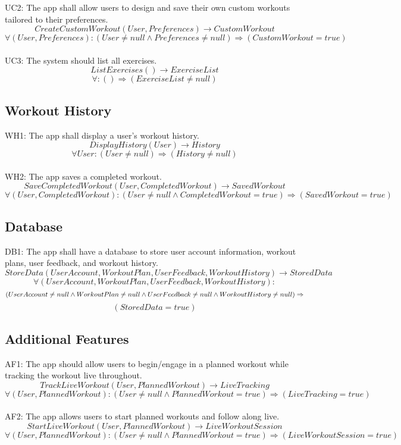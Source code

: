 \documentclass[12pt]{article}
\begin{document}
UC2: The app shall allow users to design and save their own custom workouts tailored to their preferences.
\[CreateCustomWorkout(User, Preferences) \rightarrow CustomWorkout \]
\[ \forall (User, Preferences):(User \neq null \land Preferences \neq null) \Rightarrow (CustomWorkout = true) \]\\

UC3: The system should list all exercises.
\[ListExercises() \rightarrow ExerciseList \]
\[ \forall : () \Rightarrow (ExerciseList \neq null) \]

\subsection{Workout History}
WH1: The app shall display a user’s workout history.
\[DisplayHistory(User) \rightarrow History \]
\[ \forall User: (User \neq null) \Rightarrow (History \neq null) \]\\

WH2: The app saves a completed workout.
\[SaveCompletedWorkout(User, CompletedWorkout) \rightarrow SavedWorkout \]
\[ \forall (User, CompletedWorkout): (User \neq null \land CompletedWorkout = true) \Rightarrow (SavedWorkout = true) \]

\subsection{Database}
DB1: The app shall have a database to store user account information, workout plans, user feedback, and workout history.
\[StoreData(UserAccount, WorkoutPlan, UserFeedback, WorkoutHistory) \rightarrow StoredData \]
\[ \forall (UserAccount, WorkoutPlan, UserFeedback, WorkoutHistory):\] 
\[(UserAccount \neq null \land WorkoutPlan \neq null \land UserFeedback \neq null \land WorkoutHistory \neq null) \\
\Rightarrow\] \[(StoredData = true) \]

\subsection{Additional Features}
AF1: The app should allow users to begin/engage in a planned workout while tracking the workout live throughout.
\[TrackLiveWorkout(User, PlannedWorkout) \rightarrow LiveTracking \]
\[ \forall (User, PlannedWorkout): (User \neq null \land PlannedWorkout = true) \Rightarrow (LiveTracking = true) \]\\

AF2: The app allows users to start planned workouts and follow along live.
\[StartLiveWorkout(User, PlannedWorkout) \rightarrow LiveWorkoutSession \]
\[ \forall (User, PlannedWorkout): (User \neq null \land PlannedWorkout = true) \Rightarrow (LiveWorkoutSession = true) \]\\
\end{document}
